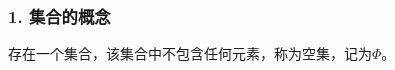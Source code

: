 \documentclass{beamer}
\begin{document}
\begin{CJK*}{UTF8}{gbsn}


\begin{frame}
  \frametitle{1. 集合的概念}

存在一个集合，该集合中不包含任何元素，称为\alert{空集}，记为$\Phi$。


\end{frame}
\end{CJK*}
\end{document}

